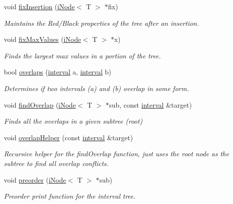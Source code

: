 \begin{DoxyCompactItemize}
void \hyperlink{classinterval_tree_a6577575e3f89b035e6d01f39b1a8081f}{fix\-Insertion} (\hyperlink{classi_node}{i\-Node}$<$ T $>$ $\ast$fix)
\begin{DoxyCompactList}\small\item\em Maintains the Red/\-Black properties of the tree after an insertion. \end{DoxyCompactList}\item 
void \hyperlink{classinterval_tree_a755ba72519607da1fa2b64e637f75dfe}{fix\-Max\-Values} (\hyperlink{classi_node}{i\-Node}$<$ T $>$ $\ast$x)
\begin{DoxyCompactList}\small\item\em Finds the largest max values in a portion of the tree. \end{DoxyCompactList}\item 
bool \hyperlink{classinterval_tree_a89f4761ca4516e5bd555c07e2aba86fd}{overlaps} (\hyperlink{classinterval}{interval} a, \hyperlink{classinterval}{interval} b)
\begin{DoxyCompactList}\small\item\em Determines if two intervals (a) and (b) overlap in some form. \end{DoxyCompactList}\item 
void \hyperlink{classinterval_tree_aa63459da57b9cd7cc74bcec768200ed6}{find\-Overlap} (\hyperlink{classi_node}{i\-Node}$<$ T $>$ $\ast$sub, const \hyperlink{classinterval}{interval} \&target)
\begin{DoxyCompactList}\small\item\em Finds all the overlaps in a given subtree (root) \end{DoxyCompactList}\item 
void \hyperlink{classinterval_tree_a78b2a7b7e67b9a46317db8799449ac27}{overlap\-Helper} (const \hyperlink{classinterval}{interval} \&target)
\begin{DoxyCompactList}\small\item\em Recursive helper for the find\-Overlap function, just uses the root node as the subtree to find all overlap conflicts. \end{DoxyCompactList}\item 
void \hyperlink{classinterval_tree_a33734743c5425ab0dfb5146d15116f5f}{preorder} (\hyperlink{classi_node}{i\-Node}$<$ T $>$ $\ast$sub)
\begin{DoxyCompactList}\small\item\em Preorder print function for the interval tree. \end{DoxyCompactList}\item 

\end{DoxyCompactItemize}
